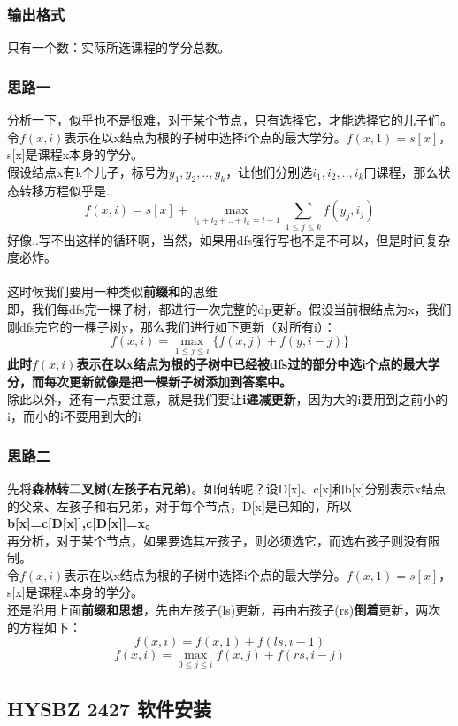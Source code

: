     \subsubsection{输出格式}
        只有一个数：实际所选课程的学分总数。
    \subsubsection{思路一}
        分析一下，似乎也不是很难，对于某个节点，只有选择它，才能选择它的儿子们。\\
        令$f(x,i)$表示在以x结点为根的子树中选择i个点的最大学分。$f(x,1)=s[x]$，s[x]是课程x本身的学分。\\
        假设结点x有k个儿子，标号为$y_1,y_2,..,y_k$，让他们分别选$i_1,i_2,..,i_k$门课程，那么状态转移方程似乎是..
        $$f(x,i)=s[x]+\max_{i_1+i_2+..+i_k=i-1}{\sum_{1 \leq j \leq k}{f(y_j,i_j)}}$$
        好像..写不出这样的循环啊，当然，如果用dfs强行写也不是不可以，但是时间复杂度必炸。\\\\
        这时候我们要用一种类似\textbf{前缀和}的思维\\
        即，我们每dfs完一棵子树，都进行一次完整的dp更新。假设当前根结点为x，我们刚dfs完它的一棵子树y，那么我们进行如下更新（对所有i）：
        $$f(x,i)=\max_{1\leq j\leq i}{\{f(x,j)+f(y,i-j)\}}$$
        \textbf{此时$f(x,i)$表示在以x结点为根的子树中已经被dfs过的部分中选i个点的最大学分，而每次更新就像是把一棵新子树添加到答案中。}\\
        除此以外，还有一点要注意，就是我们要让\textbf{i递减更新}，因为大的i要用到之前小的i，而小的i不要用到大的i
    \subsubsection{思路二}
        先将\textbf{森林转二叉树(左孩子右兄弟)}。如何转呢？设D[x]、c[x]和b[x]分别表示x结点的父亲、左孩子和右兄弟，对于每个节点，D[x]是已知的，所以\textbf{b[x]=c[D[x]],c[D[x]]=x}。\\
        再分析，对于某个节点，如果要选其左孩子，则必须选它，而选右孩子则没有限制。\\
        令$f(x,i)$表示在以x结点为根的子树中选择i个点的最大学分。$f(x,1)=s[x]$，s[x]是课程x本身的学分。\\
        还是沿用上面\textbf{前缀和思想}，先由左孩子(ls)更新，再由右孩子(rs)\textbf{倒着}更新，两次的方程如下：
        $$f(x,i)=f(x,1)+f(ls,i-1)$$
        $$f(x,i)=\max_{0\leq j\leq i}{f(x,j)+f(rs,i-j)}$$

\subsection{HYSBZ 2427 软件安装}

